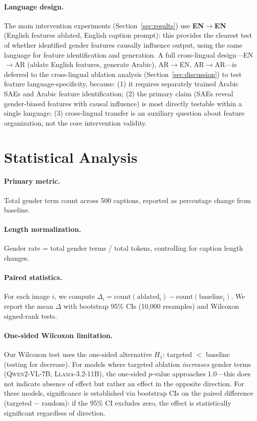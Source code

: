 \documentclass[11pt,a4paper]{article}
\newcommand{\modelname}[1]{\textsc{#1}}
\newcommand{\qwen}{\modelname{Qwen2-VL-7B}}
\newcommand{\llama}{\modelname{Llama-3.2-11B}}
\begin{document}
\paragraph{Language design.}
The main intervention experiments (Section~\ref{sec:results}) use \textbf{EN$\to$EN} (English features ablated, English caption prompt): this provides the clearest test of whether identified gender features causally influence output, using the same language for feature identification and generation.
A full cross-lingual design---EN$\to$AR (ablate English features, generate Arabic), AR$\to$EN, AR$\to$AR---is deferred to the cross-lingual ablation analysis (Section~\ref{sec:discussion}) to test feature language-specificity, because:
(1) it requires separately trained Arabic SAEs and Arabic feature identification;
(2) the primary claim (SAEs reveal gender-biased features with causal influence) is most directly testable within a single language;
(3) cross-lingual transfer is an auxiliary question about feature organization, not the core intervention validity.

\section{Statistical Analysis}
\label{sec:stats}

\paragraph{Primary metric.}
Total gender term count across 500 captions, reported as percentage change from baseline.

\paragraph{Length normalization.}
Gender rate = total gender terms / total tokens, controlling for caption length changes.

\paragraph{Paired statistics.}
For each image $i$, we compute $\Delta_i = \text{count}(\text{ablated}_i) - \text{count}(\text{baseline}_i)$.
We report the mean $\Delta$ with bootstrap 95\% CIs (10,000 resamples) and Wilcoxon signed-rank tests.

\paragraph{One-sided Wilcoxon limitation.}
Our Wilcoxon test uses the one-sided alternative $H_1$: targeted $<$ baseline (testing for decrease).
For models where targeted ablation \emph{increases} gender terms (\qwen{}, \llama{}), the one-sided $p$-value approaches 1.0---this does not indicate absence of effect but rather an effect in the opposite direction.
For these models, significance is established via bootstrap CIs on the paired difference (targeted $-$ random): if the 95\% CI excludes zero, the effect is statistically significant regardless of direction.
\end{document}
